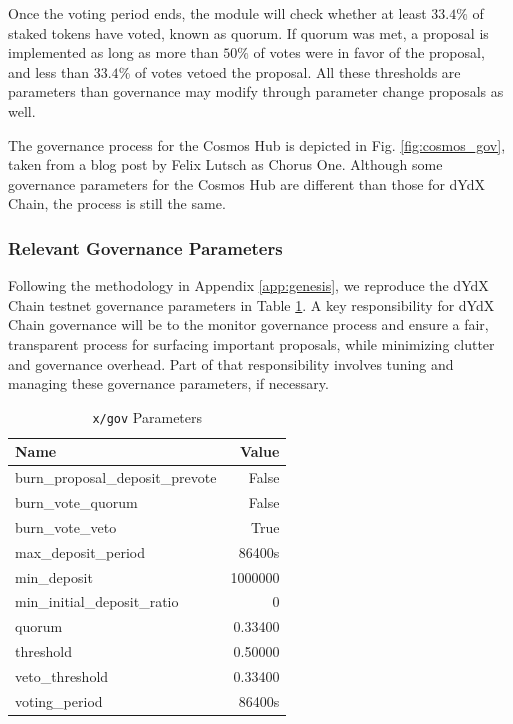         Once the voting period ends, the module will check whether at least $33.4\%$ of staked tokens have voted, known as quorum. If quorum was met, a proposal is implemented as long as more than $50\%$ of votes were in favor of the proposal, and less than $33.4\%$ of votes vetoed the proposal. All these thresholds are parameters than governance may modify through parameter change proposals as well.

        The governance process for the Cosmos Hub is depicted in Fig. \ref{fig:cosmos_gov}, taken from a blog post by Felix Lutsch as Chorus One. Although some governance parameters for the Cosmos Hub are different than those for dYdX Chain, the process is still the same.

        \subsubsection{Relevant Governance Parameters}

            Following the methodology in Appendix \ref{app:genesis}, we reproduce the dYdX Chain testnet governance parameters in Table \ref{tab:x_gov_params}. A key responsibility for dYdX Chain governance will be to the monitor governance process and ensure a fair, transparent process for surfacing important proposals, while minimizing clutter and governance overhead. Part of that responsibility involves tuning and managing these governance parameters, if necessary.

            \begin{table}[htp]
                \centering
                \captionsetup{justification=centering}
                \caption{\texttt{x/gov} Parameters}
                \begin{tabular}{lr}
                    \toprule
                    Name & Value \\
                    \midrule
                    burn\_proposal\_deposit\_prevote & False \\
                    burn\_vote\_quorum & False \\
                    burn\_vote\_veto & True \\
                    max\_deposit\_period & 86400s \\
                    min\_deposit & 1000000 \\
                    min\_initial\_deposit\_ratio & 0 \\
                    quorum & 0.33400 \\
                    threshold & 0.50000 \\
                    veto\_threshold & 0.33400 \\
                    voting\_period & 86400s \\
                    \bottomrule
                \end{tabular}
                \label{tab:x_gov_params}
            \end{table}
        
